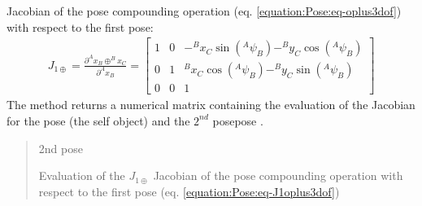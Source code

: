 \documentclass[letterpaper,10pt,english]{sphinxmanual}
\begin{document}
\begin{fulllineitems}
\begin{fulllineitems}
\label{\detokenize{Pose:Pose.Pose3D.J_1oplus}}
\pysigstartsignatures
{}
\pysigstopsignatures
\sphinxAtStartPar
Jacobian of the pose compounding operation (eq. \eqref{equation:Pose:eq-oplus3dof}) with respect to the first pose:
\begin{equation}\label{equation:Pose:eq-J1oplus3dof}
\begin{split}J_{1\oplus}=\frac{\partial  ^Ax_B \oplus ^Bx_C}{\partial ^Ax_B} =
\begin{bmatrix}
    1 & 0 &  -^Bx_C \sin(^A\psi_B) - ^By_C \cos(^A\psi_B) \\
    0 & 1 &  ^Bx_C \cos(^A\psi_B) - ^By_C \sin(^A\psi_B) \\
    0 & 0 & 1
\end{bmatrix}\end{split}
\end{equation}
\sphinxAtStartPar
The method returns a numerical matrix containing the evaluation of the Jacobian for the pose  (the self object) and the \(2^{nd}\) posepose .
\begin{quote}\begin{description}
\sphinxAtStartPar
{} \textendash{} 2nd pose

\sphinxAtStartPar
Evaluation of the \(J_{1\oplus}\) Jacobian of the pose compounding operation with respect to the first pose (eq. \eqref{equation:Pose:eq-J1oplus3dof})

\end{description}\end{quote}

\end{fulllineitems}



\end{fulllineitems}
\end{document}
